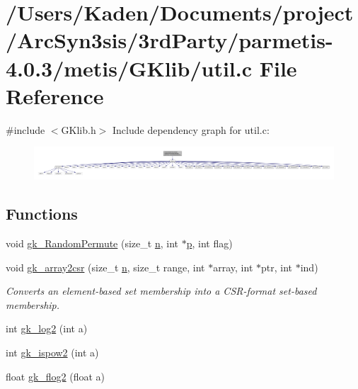 \hypertarget{a00867}{}\section{/\+Users/\+Kaden/\+Documents/project/\+Arc\+Syn3sis/3rd\+Party/parmetis-\/4.0.3/metis/\+G\+Klib/util.c File Reference}
\label{a00867}
{\ttfamily \#include $<$G\+Klib.\+h$>$}\newline
Include dependency graph for util.\+c\+:\nopagebreak
\begin{figure}[H]
\begin{center}
\leavevmode
\includegraphics[width=350pt]{a00868}
\end{center}
\end{figure}
\subsection*{Functions}
\begin{DoxyCompactItemize}
\item 
void \hyperlink{a00867_a3f23c758d814c21be0a0a840234c6429}{gk\+\_\+\+Random\+Permute} (size\+\_\+t \hyperlink{a00623_a781a04ab095280f838ff3eb0e51312e0}{n}, int $\ast$\hyperlink{a00614_a1e0420801cd5156c14e085b87a4945f5}{p}, int flag)
\item 
void \hyperlink{a00867_ab6b93b50df474335a0f8700e3f56e689}{gk\+\_\+array2csr} (size\+\_\+t \hyperlink{a00623_a781a04ab095280f838ff3eb0e51312e0}{n}, size\+\_\+t range, int $\ast$array, int $\ast$ptr, int $\ast$ind)
\begin{DoxyCompactList}\small\item\em Converts an element-\/based set membership into a C\+S\+R-\/format set-\/based membership. \end{DoxyCompactList}\item 
int \hyperlink{a00867_abd15453cc17729704313317fd612fc6b}{gk\+\_\+log2} (int a)
\item 
int \hyperlink{a00867_a3c34c6c0ef65d5d47a8daed527cf6a43}{gk\+\_\+ispow2} (int a)
\item 
float \hyperlink{a00867_a4a0bad246051d659ac5f78db3498e891}{gk\+\_\+flog2} (float a)
\end{DoxyCompactItemize}


